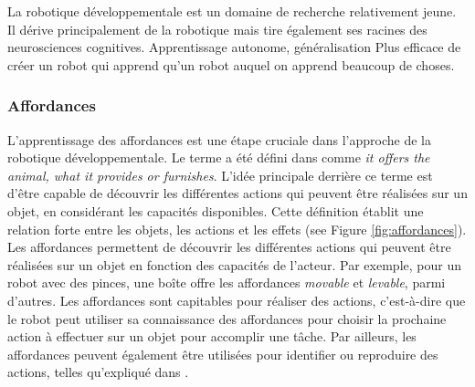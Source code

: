 \documentclass{llncs}
\begin{document}

La robotique développementale est un domaine de recherche relativement jeune. Il dérive principalement de la robotique mais tire également ses racines des neurosciences cognitives.
Apprentissage autonome, généralisation
Plus efficace de créer un robot qui apprend qu'un robot auquel on apprend beaucoup de choses.

\subsubsection{Affordances}
L'apprentissage des affordances est une étape cruciale dans l'approche de la robotique développementale. Le terme a été défini dans \cite{opac-b1085639} comme \textit{it offers the animal, what it provides or furnishes}. L'idée principale derrière ce terme est d'être capable de découvrir les différentes actions qui peuvent être réalisées sur un objet, en considérant les capacités disponibles. Cette définition établit une relation forte entre les objets, les actions et les effets (see Figure \ref{fig:affordances}). Les affordances permettent de découvrir les différentes actions qui peuvent être réalisées sur un objet en fonction des capacités de l'acteur. Par exemple, pour un robot avec des pinces, une boîte offre les affordances  \textit{movable} et \textit{levable}, parmi d'autres. Les affordances sont capitables pour réaliser des actions, c'est-à-dire que le robot peut utiliser sa connaissance des affordances pour choisir la prochaine action à effectuer sur un objet pour accomplir une tâche. Par ailleurs, les affordances peuvent également être utilisées pour identifier ou reproduire des actions, telles qu'expliqué dans \cite{4399517}.

\end{document}
